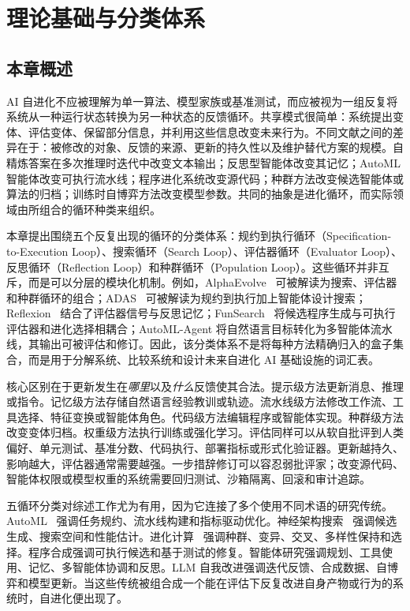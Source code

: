 
\section{理论基础与分类体系}\label{ch:theory}

\subsection{本章概述}\label{sec:ch2-overview}

AI 自进化不应被理解为单一算法、模型家族或基准测试，而应被视为一组反复将系统从一种运行状态转换为另一种状态的反馈循环。共享模式很简单：系统提出变体、评估变体、保留部分信息，并利用这些信息改变未来行为。不同文献之间的差异在于：被修改的对象、反馈的来源、更新的持久性以及维护替代方案的规模。自精炼答案在多次推理时迭代中改变文本输出；反思型智能体改变其记忆；AutoML 智能体改变可执行流水线；程序进化系统改变源代码；种群方法改变候选智能体或算法的归档；训练时自博弈方法改变模型参数。共同的抽象是进化循环，而实际领域由所组合的循环种类来组织。

本章提出围绕五个反复出现的循环的分类体系：规约到执行循环（Specification-to-Execution Loop）、搜索循环（Search Loop）、评估器循环（Evaluator Loop）、反思循环（Reflection Loop）和种群循环（Population Loop）。这些循环并非互斥，而是可以分层的模块化机制。例如，AlphaEvolve~\cite{alphaevolve2025} 可被解读为搜索、评估器和种群循环的组合；ADAS~\cite{adas2025} 可被解读为规约到执行加上智能体设计搜索；Reflexion~\cite{reflexion2023} 结合了评估器信号与反思记忆；FunSearch~\cite{funsearch2024} 将候选程序生成与可执行评估器和进化选择相耦合；AutoML-Agent 将自然语言目标转化为多智能体流水线，其输出可被评估和修订。因此，该分类体系不是将每种方法精确归入的盒子集合，而是用于分解系统、比较系统和设计未来自进化 AI 基础设施的词汇表。

核心区别在于更新发生在\emph{哪里}以及\emph{什么}反馈使其合法。提示级方法更新消息、推理或指令。记忆级方法存储自然语言经验教训或轨迹。流水线级方法修改工作流、工具选择、特征变换或智能体角色。代码级方法编辑程序或智能体实现。种群级方法改变变体归档。权重级方法执行训练或强化学习。评估同样可以从软自批评到人类偏好、单元测试、基准分数、代码执行、部署指标或形式化验证器。更新越持久、影响越大，评估器通常需要越强。一步措辞修订可以容忍弱批评家；改变源代码、智能体权限或模型权重的系统需要回归测试、沙箱隔离、回滚和审计追踪。

五循环分类对综述工作尤为有用，因为它连接了多个使用不同术语的研究传统。AutoML~\cite{zoph2018learning} 强调任务规约、流水线构建和指标驱动优化。神经架构搜索~\cite{liu2018darts,real2019regularized} 强调候选生成、搜索空间和性能估计。进化计算~\cite{stanley2002evolving,lehman2011abandoning} 强调种群、变异、交叉、多样性保持和选择。程序合成强调可执行候选和基于测试的修复。智能体研究强调规划、工具使用、记忆、多智能体协调和反思。LLM 自我改进强调迭代反馈、合成数据、自博弈和模型更新。当这些传统被组合成一个能在评估下反复改进自身产物或行为的系统时，自进化便出现了。

